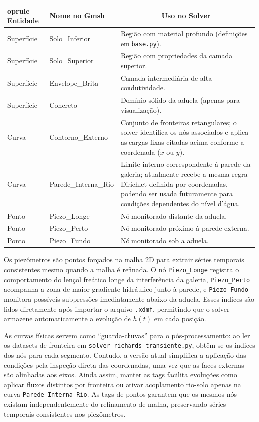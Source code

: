 \documentclass[a4paper,12pt]{article}
\begin{document}
\begin{center}
\begin{tabularx}{\textwidth}{l>{\ttfamily}lX}
	oprule
Entidade & Nome no Gmsh & \multicolumn{1}{c}{Uso no Solver} \\
\midrule
Superfície & Solo\_Inferior & Região com material profundo (definições em \texttt{base.py}). \\
Superfície & Solo\_Superior & Região com propriedades da camada superior. \\
Superfície & Envelope\_Brita & Camada intermediária de alta condutividade. \\
Superfície & Concreto & Domínio sólido da aduela (apenas para visualização). \\
Curva & Contorno\_Externo & Conjunto de fronteiras retangulares; o solver identifica os nós associados e aplica as cargas fixas citadas acima conforme a coordenada ($x$ ou $y$). \\
Curva & Parede\_Interna\_Rio & Limite interno correspondente à parede da galeria; atualmente recebe a mesma regra Dirichlet definida por coordenadas, podendo ser usada futuramente para condições dependentes do nível d'água. \\
Ponto & Piezo\_Longe & Nó monitorado distante da aduela. \\
Ponto & Piezo\_Perto & Nó monitorado próximo à parede externa. \\
Ponto & Piezo\_Fundo & Nó monitorado sob a aduela. \\
\bottomrule
\end{tabularx}
\end{center}

Os piezômetros são pontos forçados na malha 2D para extrair séries temporais consistentes mesmo quando a malha é refinada. O nó \texttt{Piezo\_Longe} registra o comportamento do lençol freático longe da interferência da galeria, \texttt{Piezo\_Perto} acompanha a zona de maior gradiente hidráulico junto à parede, e \texttt{Piezo\_Fundo} monitora possíveis subpressões imediatamente abaixo da aduela. Esses índices são lidos diretamente após importar o arquivo \texttt{.xdmf}, permitindo que o solver armazene automaticamente a evolução de $h(t)$ em cada posição.

As curvas físicas servem como ``guarda-chuvas'' para o pós-processamento: ao ler os datasets de fronteira em \texttt{solver\_richards\_transiente.py}, obtêm-se os índices dos nós para cada segmento. Contudo, a versão atual simplifica a aplicação das condições pela inspeção direta das coordenadas, uma vez que as faces externas são alinhadas aos eixos. Ainda assim, manter as tags facilita evoluções como aplicar fluxos distintos por fronteira ou ativar acoplamento rio-solo apenas na curva \texttt{Parede\_Interna\_Rio}. As tags de pontos garantem que os mesmos nós existam independentemente do refinamento de malha, preservando séries temporais consistentes nos piezômetros.
\end{document}
